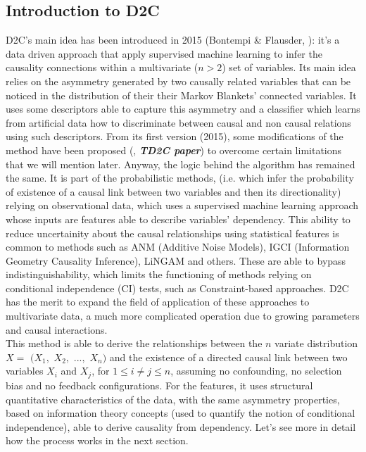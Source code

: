\subsection{Introduction to D2C}\label{introd2c}
D2C's main idea has been introduced in 2015 (Bontempi \& Flausder, \cite{bontempi2015dependency}): it's a data driven approach that apply supervised machine learning to infer the causality connections within a multivariate ($n>2$) set of variables. Its main idea relies on the asymmetry generated by two causally related variables that can be noticed in the distribution of their their Markov Blankets' connected variables. It uses some descriptors able to capture this asymmetry and a classifier which learns from artificial data how to discriminate between causal and non causal relations using such descriptors. From its first version (2015), some modifications of the method have been proposed (\cite{bontempi2020learning}, \textbf{\textit{TD2C paper}}) to overcome certain limitations that we will mention later. Anyway, the logic behind the algorithm has remained the same. It is part of the probabilistic methods, (i.e. which infer the probability of existence of a causal link between two variables and then its directionality) relying on observational data, which uses a supervised machine learning approach whose inputs are features able to describe variables' dependency. This ability to reduce uncertainity about the causal relationships using statistical features is common to methods such as ANM (Additive Noise Models), IGCI (Information Geometry Causality Inference), LiNGAM and others. These are able to bypass indistinguishability, which limits the functioning of methods relying on conditional independence (CI) tests, such as Constraint-based approaches. D2C has the merit to expand the field of application of these approaches to multivariate data, a much more complicated operation due to growing parameters and causal interactions.\\
This method is able to derive the relationships between the $n$ variate distribution $X =$ $(X_1,$ $X_2,$ $...,$ $X_n)$ and the existence of a directed causal link between two variables $X_i$ and $X_j$, for $1 \leq i \neq j \leq n$, assuming no confounding, no selection bias and no feedback configurations. 
For the features, it uses structural quantitative characteristics of the data, with the same asymmetry properties, based on information theory concepts (used to quantify the notion of conditional independence), able to derive causality from dependency. Let's see more in detail how the process works in the next section.\\

